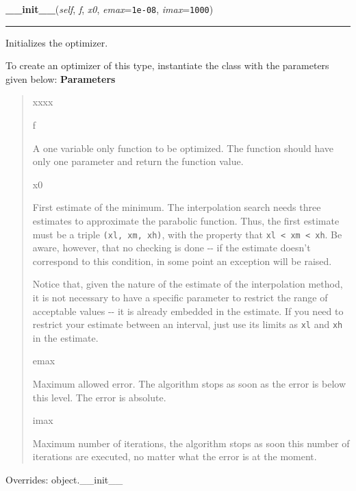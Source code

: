 \hspace{.8\funcindent}\begin{boxedminipage}{\funcwidth}

    \raggedright \textbf{\_\_init\_\_}(\textit{self}, \textit{f}, \textit{x0}, \textit{emax}={\tt 1e-08}, \textit{imax}={\tt 1000})

    \vspace{-1.5ex}

    \rule{\textwidth}{0.5\fboxrule}
\setlength{\parskip}{2ex}

Initializes the optimizer.

To create an optimizer of this type, instantiate the class with the
parameters given below:
\setlength{\parskip}{1ex}
      \textbf{Parameters}
      \vspace{-1ex}

      \begin{quote}
        \begin{Ventry}{xxxx}

          \item[f]


A one variable only function to be optimized. The function should
have only one parameter and return the function value.
          \item[x0]


First estimate of the minimum. The interpolation search needs three
estimates to approximate the parabolic function. Thus, the first
estimate must be a triple \texttt{(xl, xm, xh)}, with the property that
\texttt{xl < xm < xh}. Be aware, however, that no checking is done -{}- if
the estimate doesn't correspond to this condition, in some point an
exception will be raised.

Notice that, given the nature of the estimate of the interpolation
method, it is not necessary to have a specific parameter to restrict
the range of acceptable values -{}- it is already embedded in the
estimate. If you need to restrict your estimate between an interval,
just use its limits as \texttt{xl} and \texttt{xh} in the estimate.
          \item[emax]


Maximum allowed error. The algorithm stops as soon as the error is
below this level. The error is absolute.
          \item[imax]


Maximum number of iterations, the algorithm stops as soon this
number of iterations are executed, no matter what the error is at
the moment.
        \end{Ventry}

      \end{quote}

      Overrides: object.\_\_init\_\_

    \end{boxedminipage}

